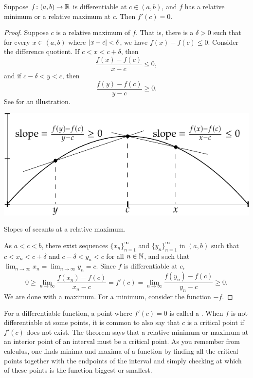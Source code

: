 \begin{lemma}\label{relminmax:lemma}
Suppose $f \colon (a,b) \to {\mathbb{R}}$ is differentiable at $c \in (a,b)$,
and $f$ has
a relative minimum or a relative maximum at $c$.  Then
$f'(c) = 0$.
\end{lemma}

\begin{proof}
Suppose $c$ is a 
relative maximum of $f$.  That is, there is a $\delta > 0$ such
that for every $x \in (a,b)$ where
$\left\lvert {x-c} \right\rvert < \delta$, we have $f(x)-f(c) \leq 0$.
Consider the difference
quotient.  If $c < x < c+\delta$, then
\begin{equation*}
\frac{f(x)-f(c)}{x-c} \leq 0 ,
\end{equation*}
and if $c-\delta < y < c$, then
\begin{equation*}
\frac{f(y)-f(c)}{y-c} \geq 0 .
\end{equation*}
See  for an illustration.
\begin{myfigureht}
\includegraphics{figures/critpt}
\caption{Slopes of secants at a relative maximum.\label{fig:critpt}}
\end{myfigureht}

As $a < c < b$, there exist
sequences $\{ x_n \}_{n=1}^\infty$ and
$\{ y_n \}_{n=1}^\infty$ in $(a,b)$
such that $c < x_n < c+\delta$ and
$c-\delta < y_n < c$ for all $n \in {\mathbb{N}}$, and such that
$\lim_{n\to\infty} x_n = \lim_{n\to\infty} y_n = c$.
Since $f$
is differentiable at $c$,
\begin{equation*}
0 \geq \lim_{n\to\infty} \frac{f(x_n)-f(c)}{x_n-c} 
=
f'(c)
=
\lim_{n\to\infty} \frac{f(y_n)-f(c)}{y_n-c} \geq 0.
\end{equation*}
We are done with a maximum.
For a minimum, consider
the function $-f$.
\end{proof}

For a differentiable function, a point where 
$f'(c) = 0$ is called a \emph{}.  When $f$ is not
differentiable at some points,
it is common to also say that $c$ is a critical point
if $f'(c)$ does not exist.
The theorem says that a relative minimum or maximum at an interior point
of an interval must be a critical point.
As you remember from calculus, one finds minima and maxima of a function
by finding all the critical points together with the endpoints of
the interval and simply checking at which of these points
is the function biggest or smallest.

